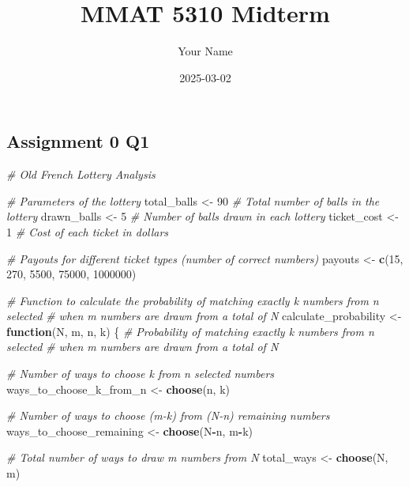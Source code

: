 \documentclass[
]{article}
\title{MMAT 5310 Midterm}
\author{Your Name}
\date{2025-03-02}
\newenvironment{Shaded}{\begin{snugshade}}{\end{snugshade}}
\newcommand{\CommentTok}[1]{\textcolor[rgb]{0.56,0.35,0.01}{\textit{#1}}}
\newcommand{\ControlFlowTok}[1]{\textcolor[rgb]{0.13,0.29,0.53}{\textbf{#1}}}
\newcommand{\DecValTok}[1]{\textcolor[rgb]{0.00,0.00,0.81}{#1}}
\newcommand{\FunctionTok}[1]{\textcolor[rgb]{0.13,0.29,0.53}{\textbf{#1}}}
\newcommand{\NormalTok}[1]{#1}
\newcommand{\OtherTok}[1]{\textcolor[rgb]{0.56,0.35,0.01}{#1}}
\newcommand{\SpecialCharTok}[1]{\textcolor[rgb]{0.81,0.36,0.00}{\textbf{#1}}}
\begin{document}
\maketitle

\subsection{Assignment 0 Q1}\label{assignment-0-q1}

\begin{Shaded}
\begin{Highlighting}[]
\CommentTok{\# Old French Lottery Analysis}

\CommentTok{\# Parameters of the lottery}
\NormalTok{total\_balls }\OtherTok{\textless{}{-}} \DecValTok{90}      \CommentTok{\# Total number of balls in the lottery}
\NormalTok{drawn\_balls }\OtherTok{\textless{}{-}} \DecValTok{5}       \CommentTok{\# Number of balls drawn in each lottery}
\NormalTok{ticket\_cost }\OtherTok{\textless{}{-}} \DecValTok{1}       \CommentTok{\# Cost of each ticket in dollars}

\CommentTok{\# Payouts for different ticket types (number of correct numbers)}
\NormalTok{payouts }\OtherTok{\textless{}{-}} \FunctionTok{c}\NormalTok{(}\DecValTok{15}\NormalTok{, }\DecValTok{270}\NormalTok{, }\DecValTok{5500}\NormalTok{, }\DecValTok{75000}\NormalTok{, }\DecValTok{1000000}\NormalTok{)}

\CommentTok{\# Function to calculate the probability of matching exactly k numbers from n selected}
\CommentTok{\# when m numbers are drawn from a total of N}
\NormalTok{calculate\_probability }\OtherTok{\textless{}{-}} \ControlFlowTok{function}\NormalTok{(N, m, n, k) \{}
  \CommentTok{\# Probability of matching exactly k numbers from n selected}
  \CommentTok{\# when m numbers are drawn from a total of N}
  
  \CommentTok{\# Number of ways to choose k from n selected numbers}
\NormalTok{  ways\_to\_choose\_k\_from\_n }\OtherTok{\textless{}{-}} \FunctionTok{choose}\NormalTok{(n, k)}
  
  \CommentTok{\# Number of ways to choose (m{-}k) from (N{-}n) remaining numbers}
\NormalTok{  ways\_to\_choose\_remaining }\OtherTok{\textless{}{-}} \FunctionTok{choose}\NormalTok{(N}\SpecialCharTok{{-}}\NormalTok{n, m}\SpecialCharTok{{-}}\NormalTok{k)}
  
  \CommentTok{\# Total number of ways to draw m numbers from N}
\NormalTok{  total\_ways }\OtherTok{\textless{}{-}} \FunctionTok{choose}\NormalTok{(N, m)}
  

\end{Highlighting}
\end{Shaded}
\end{document}
